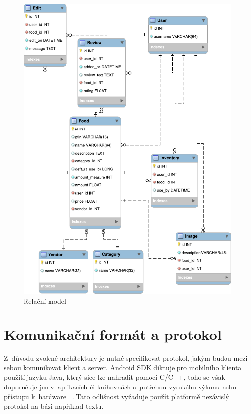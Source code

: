 \documentclass[thesis=B,czech]{FITthesis}[2013/10/20]
\begin{document}
\begin{figure}[H]
  \centering
  \includegraphics[scale=1.20]{diagrams/relational_model}
  \caption{Relační model}
  \label{fig:RelationalModel}
\end{figure}


\section{Komunikační formát a protokol}

Z~důvodu zvolené architektury je nutné specifikovat protokol, jakým budou mezi sebou komunikovat klient a server. Android SDK diktuje pro mobilního klienta použití jazyku Java, který sice lze nahradit pomocí C/C++, toho se však doporučuje jen v~aplikacích či knihovnách s~potřebou vysokého výkonu nebo přístupu k~hardware ~\cite{android_ndk}. Tato odlišnost vyžaduje použít platformě nezávislý protokol na bázi například textu.
\end{document}
